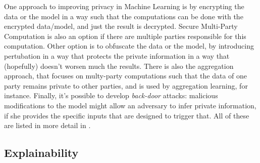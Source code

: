 One approach to improving privacy in Machine Learning is by encrypting the data or the model in a way such that the computations can be done with the encrypted data/model, and just the result is decrypted. Secure Multi-Party Computation is also an option if there are multiple parties responsible for this computation. Other option is to obfuscate the data or the model, by introducing pertubation in a way that protects the private information in a way that (hopefully) doesn't worsen much the results. There is also the aggregation approach, that focuses on multy-party computations such that the data of one party remains private to other parties, and is used by aggregation learning, for instance. Finally, it's possible to develop \textit{back-door} attacks: malicious modifications to the model might allow an adversary to infer private information, if she provides the specific inputs that are designed to trigger that. All of these are listed in more detail in \cite{WMLMPASAO}.


\subsection{Explainability}






